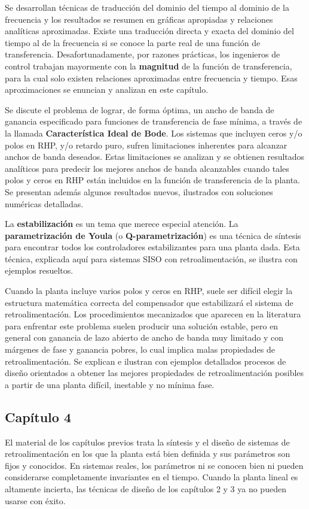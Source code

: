Se desarrollan técnicas de traducción del dominio del tiempo al dominio de la frecuencia y los resultados se resumen en gráficas apropiadas y relaciones analíticas aproximadas. Existe una traducción directa y exacta del dominio del tiempo al de la frecuencia si se conoce la parte real de una función de transferencia. Desafortunadamente, por razones prácticas, los ingenieros de control trabajan mayormente con la \textbf{magnitud} de la función de transferencia, para la cual solo existen relaciones aproximadas entre frecuencia y tiempo. Esas aproximaciones se enuncian y analizan en este capítulo.

Se discute el problema de lograr, de forma óptima, un ancho de banda de ganancia especificado para funciones de transferencia de fase mínima, a través de la llamada \textbf{Característica Ideal de Bode}. Los sistemas que incluyen ceros y/o polos en RHP, y/o retardo puro, sufren limitaciones inherentes para alcanzar anchos de banda deseados. Estas limitaciones se analizan y se obtienen resultados analíticos para predecir los mejores anchos de banda alcanzables cuando tales polos y ceros en RHP están incluidos en la función de transferencia de la planta. Se presentan además algunos resultados nuevos, ilustrados con soluciones numéricas detalladas.

La \textbf{estabilización} es un tema que merece especial atención. La \textbf{parametrización de Youla} (o \textbf{Q-parametrización}) es una técnica de síntesis para encontrar todos los controladores estabilizantes para una planta dada. Esta técnica, explicada aquí para sistemas SISO con retroalimentación, se ilustra con ejemplos resueltos.

Cuando la planta incluye varios polos y ceros en RHP, suele ser difícil elegir la estructura matemática correcta del compensador que estabilizará el sistema de retroalimentación. Los procedimientos mecanizados que aparecen en la literatura para enfrentar este problema suelen producir una solución estable, pero en general con ganancia de lazo abierto de ancho de banda muy limitado y con márgenes de fase y ganancia pobres, lo cual implica malas propiedades de retroalimentación. Se explican e ilustran con ejemplos detallados procesos de diseño orientados a obtener las mejores propiedades de retroalimentación posibles a partir de una planta difícil, inestable y no mínima fase.

\subsection{Capítulo 4}
El material de los capítulos previos trata la síntesis y el diseño de sistemas de retroalimentación en los que la planta está bien definida y sus parámetros son fijos y conocidos. En sistemas reales, los parámetros ni se conocen bien ni pueden considerarse completamente invariantes en el tiempo. Cuando la planta lineal es altamente incierta, las técnicas de diseño de los capítulos 2 y 3 ya no pueden usarse con éxito.

